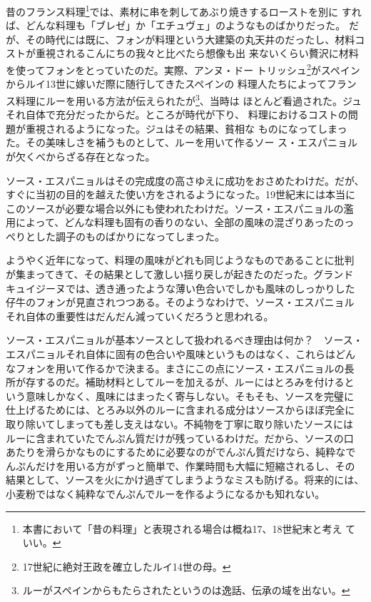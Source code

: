 昔のフランス料理\footnote{本書において「昔の料理」と表現される場合は概ね17、18世紀末と考え
  ていい。}では、素材に串を刺してあぶり焼きするローストを別に
すれば、どんな料理も「ブレゼ」か「エチュヴェ」のようなものばかりだった。
だが、その時代には既に、フォンが料理という大建築の丸天井のだったし、材料コストが重視されるこんにちの我々と比べたら想像も出
来ないくらい贅沢に材料を使ってフォンをとっていたのだ。実際、アンヌ・ドー
トリッシュ\footnote{17世紀に絶対王政を確立したルイ14世の母。}がスペインからルイ13世に嫁いだ際に随行してきたスペインの
料理人たちによってフランス料理にルーを用いる方法が伝えられたが\footnote{ルーがスペインからもたらされたというのは逸話、伝承の域を出ない。}、当時は
ほとんど看過された。ジュそれ自体で充分だったからだ。ところが時代が下り、
料理におけるコストの問題が重視されるようになった。ジュはその結果、貧相な
ものになってしまった。その美味しさを補うものとして、ルーを用いて作るソー
ス・エスパニョルが欠くべからざる存在となった。

ソース・エスパニョルはその完成度の高さゆえに成功をおさめたわけだ。だが、
すぐに当初の目的を越えた使い方をされるようになった。19世紀末には本当に
このソースが必要な場合以外にも使われたわけだ。ソース・エスパニョルの濫
用によって、どんな料理も固有の香りのない、全部の風味の混ざりあったのっ
ぺりとした調子のものばかりになってしまった。

ようやく近年になって、料理の風味がどれも同じようなものであることに批判
が集まってきて、その結果として激しい揺り戻しが起きたのだった。グランド
キュイジーヌでは、透き通ったような薄い色合いでしかも風味のしっかりした
仔牛のフォンが見直されつつある。そのようなわけで、ソース・エスパニョル
それ自体の重要性はだんだん減っていくだろうと思われる。

ソース・エスパニョルが基本ソースとして扱われるべき理由は何か？　ソース・
エスパニョルそれ自体に固有の色合いや風味というものはなく、これらはどん
なフォンを用いて作るかで決まる。まさにこの点にソース・エスパニョルの長
所が存するのだ。補助材料としてルーを加えるが、ルーにはとろみを付けると
いう意味しかなく、風味にはまったく寄与しない。そもそも、ソースを完璧に
仕上げるためには、とろみ以外のルーに含まれる成分はソースからほぼ完全に
取り除いてしまっても差し支えはない。不純物を丁寧に取り除いたソースには
ルーに含まれていたでんぷん質だけが残っているわけだ。だから、ソースの口
あたりを滑らかなものにするために必要なのがでんぷん質だけなら、純粋なで
んぷんだけを用いる方がずっと簡単で、作業時間も大幅に短縮されるし、その
結果として、ソースを火にかけ過ぎてしまうようなミスも防げる。将来的には、
小麦粉ではなく純粋なでんぷんでルーを作るようになるかも知れない。

